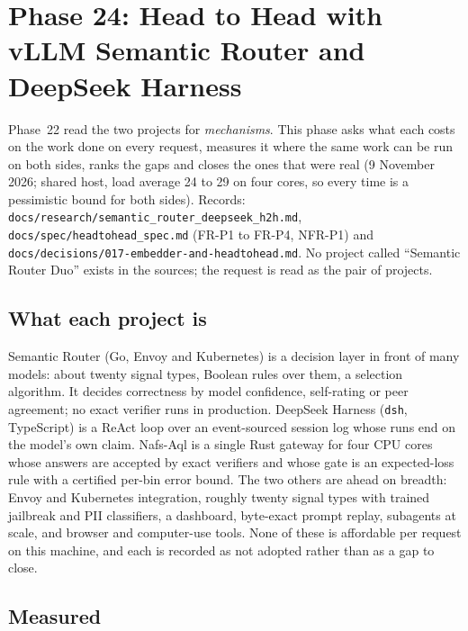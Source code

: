 \section{Phase 24: Head to Head with vLLM Semantic Router and DeepSeek Harness}
\label{sec:phase24}

Phase~22 read the two projects for \emph{mechanisms}. This phase asks what each costs on the work done on every request, measures it where the same work can be
run on both sides, ranks the gaps and closes the ones that were real (9 November 2026; shared host, load average 24 to 29 on four cores, so every time is a
pessimistic bound for both sides). Records: \texttt{docs/research/semantic\_router\_deepseek\_h2h.md},
\texttt{docs/spec/headtohead\_spec.md} (FR-P1 to FR-P4, NFR-P1) and \texttt{docs/decisions/017-embedder-and-headtohead.md}. No project called ``Semantic Router
Duo'' exists in the sources; the request is read as the pair of projects.

\subsection{What each project is}

Semantic Router (Go, Envoy and Kubernetes) is a decision layer in front of many models: about twenty signal types, Boolean rules over them, a selection algorithm.
It decides correctness by model confidence, self-rating or peer agreement; no exact verifier runs in production. DeepSeek Harness (\texttt{dsh}, TypeScript) is a
ReAct loop over an event-sourced session log whose runs end on the model's own claim. Nafs-Aql is a single Rust gateway for four CPU cores whose answers are
accepted by exact verifiers and whose gate is an expected-loss rule with a certified per-bin error bound. The two others are ahead on breadth: Envoy and Kubernetes
integration, roughly twenty signal types with trained jailbreak and PII classifiers, a dashboard, byte-exact prompt replay, subagents at scale, and browser and
computer-use tools. None of these is affordable per request on this machine, and each is recorded as not adopted rather than as a gap to close.

\subsection{Measured}

